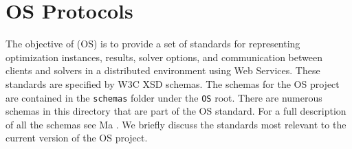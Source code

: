 \documentclass[11pt]{article}
\renewcommand{\_}{{\char"5F}}
\renewcommand{\{}{{\char"7B}}
\renewcommand{\}}{{\char"7D}}
\renewcommand{\^}{{\char"0D}}
\renewcommand{\'}{{\char"0D}}
\begin{document}
\section{OS Protocols}\label{section:schemadescriptions}



The objective of  (OS) is to provide a set of standards for representing optimization instances, results, solver options, and communication between clients and solvers in a distributed environment using Web Services.  These standards are specified by W3C XSD schemas. The schemas for the OS project are contained in the {\tt schemas} folder under the {\tt OS} root. There are numerous schemas in this directory that are part of the OS standard. For a full description of all the schemas see  Ma \cite{junma2005}.  We briefly discuss the standards most relevant to the current version of the OS project.
\end{document}

